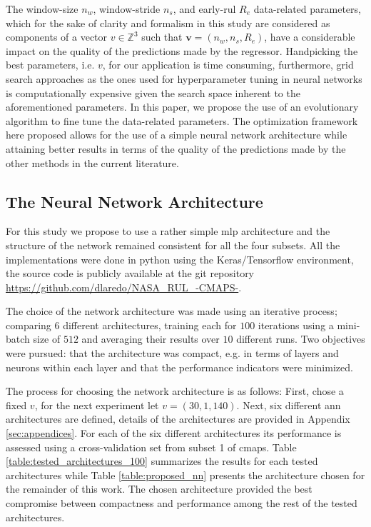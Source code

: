 \documentclass{article}
\begin{document}
The window-size $n_w$, window-stride $n_s$, and early-\gls{rul} $R_e$ data-related parameters, which for the sake of clarity and formalism in this study are considered as components of a vector $v \in \mathbb{Z}^3$ such that $\mathbf{v} = (n_w, n_s, R_e)$, have a considerable impact on the quality of the predictions made by the regressor. Handpicking the best parameters, i.e. $v$, for our application is time consuming, furthermore, grid search approaches as the ones used for hyperparameter tuning in neural networks is computationally expensive given the search space inherent to the aforementioned parameters. In this paper, we propose the use of an evolutionary algorithm to fine tune the data-related parameters. The optimization framework here proposed allows for the use of a simple neural network architecture while attaining better results in terms of the quality of the predictions made by the other methods in the current literature.

\subsection{The Neural Network Architecture}

For this study we propose to use a rather simple \gls{mlp} architecture and the structure of the network remained consistent for all the four subsets. All the implementations were done in python using the Keras/Tensorflow environment, the source code is publicly available at the git repository \url{https://github.com/dlaredo/NASA_RUL_-CMAPS-}. 

The choice of the network architecture was made using an iterative process; comparing 6 different architectures, training each for $100$ iterations using a mini-batch size of $512$ and averaging their results over $10$ different runs. Two objectives were pursued: that the architecture was compact, e.g. in terms of layers and neurons within each layer and that the performance indicators were minimized. 

The process for choosing the network architecture is as follows: First, chose a fixed $v$, for the next experiment let $v= (30, 1, 140)$. Next, six different \gls{ann} architectures are defined, details of the architectures are provided in Appendix \ref{sec:appendices}. For each of the six different architectures its performance is assessed using a cross-validation set from subset 1 of \gls{cmaps}. Table \ref{table:tested_architectures_100} summarizes the results for each tested architectures while Table \ref{table:proposed_nn} presents the architecture chosen for the remainder of this work. The chosen architecture provided the best compromise between compactness and performance among the rest of the tested architectures. 
\end{document}
